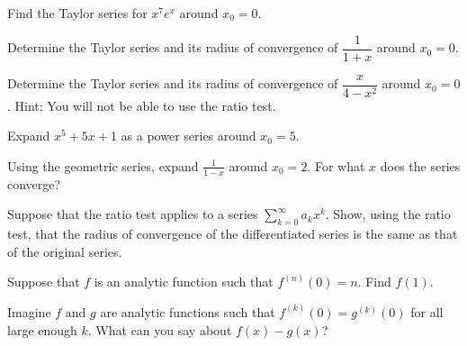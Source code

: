 \documentclass{ximera}
\begin{document}
\begin{exercise}%
    Find the Taylor series for $x^7 e^x$ around $x_0 = 0$.
\end{exercise}

\begin{exercise}
    Determine the Taylor series and its radius of convergence of $\dfrac{1}{1+x}$ around $x_0 = 0$.
\end{exercise}

\begin{exercise}
    Determine the Taylor series and its radius of convergence of $\dfrac{x}{4-x^2}$ around $x_0 = 0$.  Hint: You will not be able to use the ratio test.
\end{exercise}

\begin{exercise}
    Expand $x^5+5x+1$ as a power series around $x_0 = 5$.
\end{exercise}

\begin{exercise}%
    Using the geometric series, expand $\frac{1}{1-x}$ around $x_0=2$. For what $x$ does the series converge?
\end{exercise}

\begin{exercise}
    Suppose that the ratio test applies to a series $\displaystyle \sum_{k=0}^\infty a_k x^k$.  Show, using the ratio test, that the radius of convergence of the differentiated series is the same as that of the original series.
\end{exercise}

\begin{exercise}
    Suppose that $f$ is an analytic function such that $f^{(n)}(0) = n$.  Find $f(1)$.
\end{exercise}

\begin{exercise}%
    Imagine $f$ and $g$ are analytic functions such that $f^{(k)}(0) = g^{(k)}(0)$ for all large enough $k$.  What can you say about $f(x)-g(x)$?
\end{exercise}
%
\end{document}
